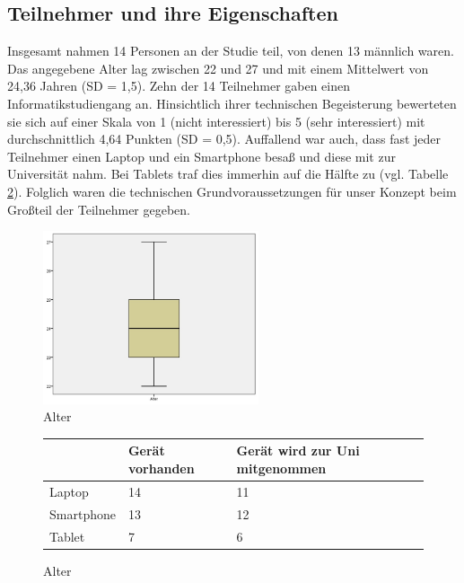 \documentclass{chi-ext}
\begin{document}
\subsection{Teilnehmer und ihre Eigenschaften}

Insgesamt nahmen 14 Personen an der Studie teil, von denen 13 männlich waren. Das angegebene Alter lag zwischen 22 und 27 und mit einem Mittelwert von 24,36 Jahren (SD = 1,5). Zehn der 14 Teilnehmer gaben einen Informatikstudiengang an. Hinsichtlich ihrer technischen Begeisterung bewerteten sie sich auf einer Skala von 1 (nicht interessiert) bis 5 (sehr interessiert) mit durchschnittlich 4,64 Punkten (SD = 0,5).
Auffallend war auch, dass fast jeder Teilnehmer einen Laptop und ein Smartphone besaß und diese mit zur Universität nahm. Bei Tablets traf dies immerhin auf die Hälfte zu (vgl. Tabelle \ref{fig:studie_tabelle}). Folglich waren die technischen Grundvoraussetzungen für unser Konzept beim Großteil der Teilnehmer gegeben.

\begin{figure}
  \centering
  \includegraphics[width=180pt]{img/studie/Alter.jpg}
  \caption{Alter}
  \label{fig:studie_alter}
\end{figure}

\begin{figure}
  \centering
\begin{tabular}{|l|p{1.5cm}|p{3cm}|}
\hline 
 & Gerät vorhanden & Gerät wird zur \newline Uni mitgenommen \\ 
\hline 
Laptop & 14 & 11 \\ 
\hline 
Smartphone & 13 & 12 \\ 
\hline 
Tablet & 7 & 6 \\ 
\hline 
\end{tabular} 
  \caption{Alter}
  \label{fig:studie_tabelle}
\end{figure}
\end{document}
